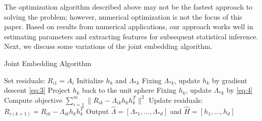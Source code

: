 \documentclass[10pt,journal,compsoc]{IEEEtran}
\begin{document}
\noindent The optimization algorithm described above may not be the fastest approach to solving the problem; however, numerical optimization is not the focus of this paper. Based on results from numerical applications, our approach works well in estimating parameters and extracting features for subsequent statistical inference. Next, we discuss some variations of the joint embedding algorithm.
\begin{algorithm}
	\caption{Joint Embedding Algorithm}
	\label{alg:je}
	\begin{algorithmic}[1]
		\State Set residuals: $R_{i1}=A_i$
		\State Initialize $h_k$ and $\Lambda_{*k}$ 
		\State Fixing $\Lambda_{*k}$, update $h_k$ by gradient descent \eqref{eq:3}
		\State Project $h_k$ back to the unit sphere
		\State Fixing $h_k$, update $\Lambda_{*k}$ by \eqref{eq:4}
		\State Compute objective $\sum\limits_{i=1}^{m} \| R_{ik}-  \Lambda_{ik} h_k h_k^T \|^2$
		\EndWhile
		\State Update residuals: $R_{i(k+1)}=R_{ik}- \Lambda_{ik} h_kh_k^T$
		\EndFor
		\State Output $\hat{\Lambda}=[\Lambda_{*1},...,\Lambda_{*d}]$ and $\hat{H}=[h_1,...,h_d]$
		\EndProcedure
	\end{algorithmic}
\end{algorithm}
\end{document}
